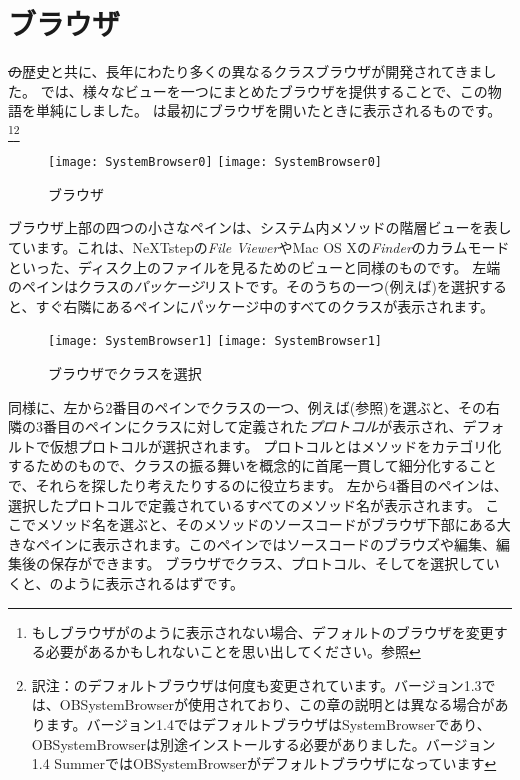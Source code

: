 \documentclass[a4paper,10pt,twoside]{book}
\begin{document}
\section{ブラウザ}

\st の歴史と共に、長年にわたり多くの異なるクラスブラウザが開発されてきました。
\pharo では、様々なビューを一つにまとめたブラウザを提供することで、この物語を単純にしました。
は最初にブラウザを開いたときに表示されるものです。\footnote{もしブラウザがのように表示されない場合、デフォルトのブラウザを変更する必要があるかもしれないことを思い出してください。参照}\footnote{訳注：\pharo のデフォルトブラウザは何度も変更されています。バージョン1.3では、OBSystemBrowserが使用されており、この章の説明とは異なる場合があります。バージョン1.4ではデフォルトブラウザはSystemBrowserであり、OBSystemBrowserは別途インストールする必要がありました。バージョン1.4 SummerではOBSystemBrowserがデフォルトブラウザになっています}

\begin{figure}[htbp]
   \centering
   \ifluluelse
{\texttt{[image: SystemBrowser0]} }
{\texttt{[image: SystemBrowser0]} }
   \caption{ブラウザ}
\end{figure}

ブラウザ上部の四つの小さなペインは、システム内メソッドの階層ビューを表しています。これは、NeXTstepの\textit{File Viewer}やMac OS Xの\textit{Finder}のカラムモードといった、ディスク上のファイルを見るためのビューと同様のものです。
左端のペインはクラスの\emph{パッケージ}リストです。そのうちの一つ(例えば)を選択すると、すぐ右隣にあるペインにパッケージ中のすべてのクラスが表示されます。

\begin{figure}[htbp]
   \centering
   \ifluluelse
{\texttt{[image: SystemBrowser1]} }
{\texttt{[image: SystemBrowser1]} }
   \caption{ブラウザでクラスを選択
   }
\end{figure}

同様に、左から2番目のペインでクラスの一つ、例えば(参照)を選ぶと、その右隣の3番目のペインにクラスに対して定義された\emph{プロトコル}が表示され、デフォルトで仮想プロトコルが選択されます。
プロトコルとはメソッドをカテゴリ化するためのもので、クラスの振る舞いを概念的に首尾一貫して細分化することで、それらを探したり考えたりするのに役立ちます。
左から4番目のペインは、選択したプロトコルで定義されているすべてのメソッド名が表示されます。
ここでメソッド名を選ぶと、そのメソッドのソースコードがブラウザ下部にある大きなペインに表示されます。このペインではソースコードのブラウズや編集、編集後の保存ができます。
ブラウザでクラス、プロトコル、そしてを選択していくと、のように表示されるはずです。
\end{document}

